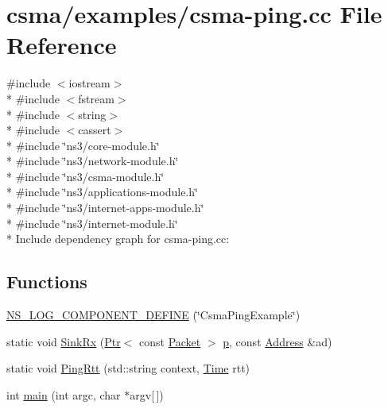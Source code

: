 \hypertarget{csma-ping_8cc}{}\section{csma/examples/csma-\/ping.cc File Reference}
\label{csma-ping_8cc}
{\ttfamily \#include $<$iostream$>$}\\*
{\ttfamily \#include $<$fstream$>$}\\*
{\ttfamily \#include $<$string$>$}\\*
{\ttfamily \#include $<$cassert$>$}\\*
{\ttfamily \#include \char`\"{}ns3/core-\/module.\+h\char`\"{}}\\*
{\ttfamily \#include \char`\"{}ns3/network-\/module.\+h\char`\"{}}\\*
{\ttfamily \#include \char`\"{}ns3/csma-\/module.\+h\char`\"{}}\\*
{\ttfamily \#include \char`\"{}ns3/applications-\/module.\+h\char`\"{}}\\*
{\ttfamily \#include \char`\"{}ns3/internet-\/apps-\/module.\+h\char`\"{}}\\*
{\ttfamily \#include \char`\"{}ns3/internet-\/module.\+h\char`\"{}}\\*
Include dependency graph for csma-\/ping.cc\+:
\subsection*{Functions}
\begin{DoxyCompactItemize}
\item 
\hyperlink{csma-ping_8cc_a00c95334e83a2ce34e1f2124c886b328}{N\+S\+\_\+\+L\+O\+G\+\_\+\+C\+O\+M\+P\+O\+N\+E\+N\+T\+\_\+\+D\+E\+F\+I\+NE} (\char`\"{}Csma\+Ping\+Example\char`\"{})
\item 
static void \hyperlink{csma-ping_8cc_ab5a3a26cb523a53ed19ba80dcbb97d11}{Sink\+Rx} (\hyperlink{classns3_1_1Ptr}{Ptr}$<$ const \hyperlink{classns3_1_1Packet}{Packet} $>$ \hyperlink{lte__link__budget__x2__handover__measures_8m_ac9de518908a968428863f829398a4e62}{p}, const \hyperlink{classns3_1_1Address}{Address} \&ad)
\item 
static void \hyperlink{csma-ping_8cc_a1a49f760c7e3da367b3406515d2a3ef9}{Ping\+Rtt} (std\+::string context, \hyperlink{classns3_1_1Time}{Time} rtt)
\item 
int \hyperlink{csma-ping_8cc_a0ddf1224851353fc92bfbff6f499fa97}{main} (int argc, char $\ast$argv\mbox{[}$\,$\mbox{]})
\end{DoxyCompactItemize}


